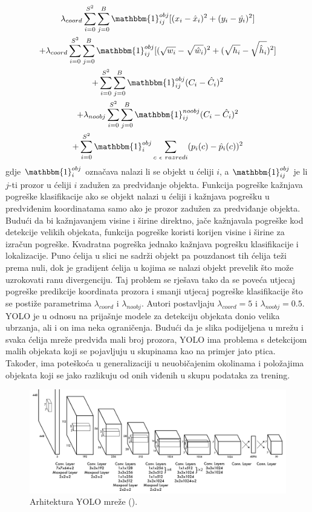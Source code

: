 \begin{multline}
 	\lambda_{coord} \sum\limits_{i=0}^{S^2} \sum\limits_{j=0}^{B} \mathbbm{1}_{ij}^{obj}[(x_i - \hat{x}_i )^2 + (y_i - \hat{y_i})^2] \\
 	+ \lambda_{coord} \sum\limits_{i=0}^{S^2} \sum\limits_{j=0}^{B} \mathbbm{1}_{ij}^{obj} [(\sqrt{w_i} - \sqrt{\hat{w}_i})^2 + (\sqrt{h_i} - \sqrt{\hat{h}_i})^2] \\
 	+ \sum\limits_{i=0}^{S^2} \sum\limits_{j=0}^{B} \mathbbm{1}_{ij}^{obj}(C_i - \hat{C}_i)^2 \\
 	+ \lambda_{noobj} \sum\limits_{i=0}^{S^2} \sum\limits_{j=0}^{B} \mathbbm{1}_{ij}^{noobj}(C_i - \hat{C}_i)^2 \\
 	+ \sum\limits_{i=0}^{S^2} \mathbbm{1}_{i}^{obj} \sum\limits_{c \ \epsilon \ razredi} (p_i(c) - \hat{p}_i(c))^2
\end{multline}
gdje $\mathbbm{1}_{i}^{obj}$ označava nalazi li se objekt u ćeliji $i$, a $\mathbbm{1}_{ij}^{obj}$ je li $j$-ti prozor u ćeliji $i$ zadužen za predviđanje objekta. Funkcija pogreške kažnjava pogreške klasifikacije ako se objekt nalazi u ćeliji i kažnjava pogrešku u predviđenim koordinatama samo ako je prozor zadužen za predviđanje objekta. Budući da bi kažnjavanjem visine i širine direktno, jače kažnjavala pogreške kod detekcije velikih objekata, funkcija pogreške koristi korijen visine i širine za izračun pogreške. Kvadratna pogreška jednako kažnjava pogrešku klasifikacije i lokalizacije. Puno ćelija u slici ne sadrži objekt pa pouzdanost tih ćelija teži prema nuli, dok je gradijent ćelija u kojima se nalazi objekt prevelik što može uzrokovati ranu divergenciju. Taj problem se rješava tako da se poveća utjecaj pogreške predikcije koordinata prozora i smanji utjecaj pogreške klasifikacije što se postiže parametrima $\lambda_{coord}$ i $\lambda_{noobj}$. Autori postavljaju $\lambda_{coord} = 5$ i $\lambda_{noobj} = 0.5$. YOLO je u odnosu na prijašnje modele za detekciju objekata donio velika ubrzanja, ali i on ima neka ograničenja. Budući da je slika podijeljena u mrežu i svaka ćelija mreže predviđa mali broj prozora, YOLO ima problema s detekcijom malih objekata koji se pojavljuju u skupinama kao na primjer jato ptica. Također, ima poteškoća u generalizaciji u neuobičajenim okolinama i položajima objekata koji se jako razlikuju od onih viđenih u skupu podataka za trening.
 
 \begin{figure}
	\centering
	\includegraphics[scale=0.5]{img/yolo_mreza.png}
	\caption{Arhitektura YOLO mreže (\cite{DBLP:journals/corr/RedmonDGF15}).}
	\label{yolo_mreza}
\end{figure}

